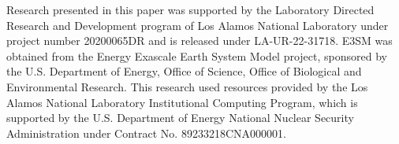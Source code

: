 \documentclass{juliacon}
\begin{document}
Research presented in this paper was supported by the Laboratory
Directed Research and Development program of Los Alamos National
Laboratory under project number 20200065DR and is released
under LA-UR-22-31718. E3SM was obtained from the Energy Exascale
Earth System Model project, sponsored by the U.S. Department
of Energy, Office of Science, Office of Biological and Environmental
Research. This research used resources provided by the Los Alamos
National Laboratory Institutional Computing Program, which is
supported by the U.S. Department of Energy National Nuclear Security
Administration under Contract No. 89233218CNA000001.



\end{document}
